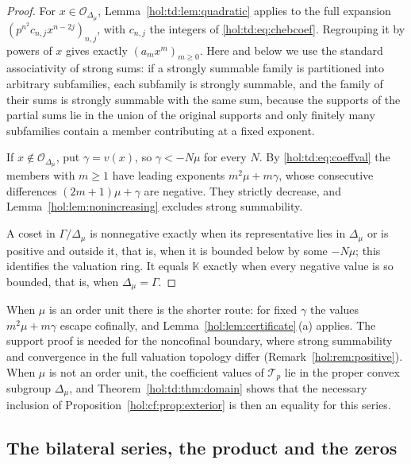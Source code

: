 \documentclass[11pt]{article}
\numberwithin{equation}{section}
\theoremstyle{definition}
\theoremstyle{remark}
\newcommand{\KK}{\mathbb K}
\begin{document}
\begin{proof}
For $x\in\mathcal O_{\Delta_\mu}$, Lemma~\ref{hol:td:lem:quadratic} applies to
the full expansion $(p^{n^2}c_{n,j}x^{n-2j})_{n,j}$, with $c_{n,j}$ the
integers of \eqref{hol:td:eq:chebcoef}. Regrouping it by powers of $x$ gives
exactly $(a_mx^m)_{m\ge0}$. Here and below we use the standard associativity
of strong sums: if a strongly summable family is partitioned into arbitrary
subfamilies, each subfamily is strongly summable, and the family of their sums
is strongly summable with the same sum, because the supports of the partial
sums lie in the union of the original supports and only finitely many
subfamilies contain a member contributing at a fixed exponent.

If $x\notin\mathcal O_{\Delta_\mu}$, put $\gamma=v(x)$, so $\gamma<-N\mu$ for
every $N$. By \eqref{hol:td:eq:coeffval} the members with $m\ge1$ have leading
exponents $m^2\mu+m\gamma$, whose consecutive differences $(2m+1)\mu+\gamma$
are negative. They strictly decrease, and
Lemma~\ref{hol:lem:nonincreasing} excludes strong summability.

A coset in $\Gamma/\Delta_\mu$ is nonnegative exactly when its representative
lies in $\Delta_\mu$ or is positive and outside it, that is, when it is
bounded below by some $-N\mu$; this identifies the valuation ring. It equals
$\KK$ exactly when every negative value is so bounded, that is, when
$\Delta_\mu=\Gamma$.
\end{proof}

When $\mu$ is an order unit there is the shorter route: for fixed $\gamma$ the
values $m^2\mu+m\gamma$ escape cofinally, and
Lemma~\ref{hol:lem:certificate}\,(a) applies. The support proof is needed for
the noncofinal boundary, where strong summability and convergence in the full
valuation topology differ (Remark~\ref{hol:rem:positive}). When $\mu$ is not an
order unit, the coefficient values of $\mathcal T_p$ lie in the proper convex
subgroup $\Delta_\mu$, and Theorem~\ref{hol:td:thm:domain} shows that the
necessary inclusion of Proposition~\ref{hol:cf:prop:exterior} is then an
equality for this series.

\subsection{The bilateral series, the product and the zeros}
\label{hol:td:sub:bilateral}
\end{document}
